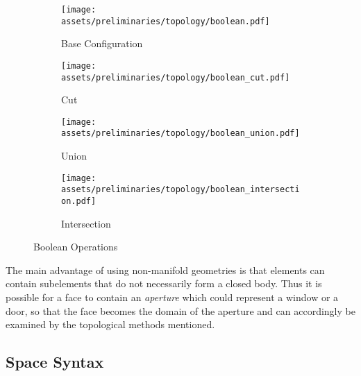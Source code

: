 \documentclass[a4paper, 12pt]{report}
\begin{document}
\begin{figure}
\centering
\begin{subfigure}{.25\textwidth}
\centering
\texttt{[image: assets/preliminaries/topology/boolean.pdf]}
\caption{Base Configuration}
\label{fig:base-configuration}
\end{subfigure}%
\begin{subfigure}{.25\textwidth}
\centering
\texttt{[image: assets/preliminaries/topology/boolean\_cut.pdf]}
\caption{Cut}
\label{fig:cut}
\end{subfigure}%
\begin{subfigure}{.25\textwidth}
\centering
\texttt{[image: assets/preliminaries/topology/boolean\_union.pdf]}
\caption{Union}
\label{fig:union}
\end{subfigure}%
\begin{subfigure}{.25\textwidth}
\centering
\texttt{[image: assets/preliminaries/topology/boolean\_intersection.pdf]}
\caption{Intersection}
\label{fig:intersection}
\end{subfigure}
\caption{Boolean Operations}
\label{fig:boolean-operations}
\end{figure}

The main advantage of using non-\gls{manifold} geometries is that elements can contain subelements that do not necessarily form a closed body. Thus it is possible for a face to contain an \textit{\gls{aperture}} which could represent a window or a door, so that the face becomes the domain of the \gls{aperture} and can accordingly be examined by the topological methods mentioned.

\subsection{Space Syntax}\label{subsec:space-syntax}
\end{document}
